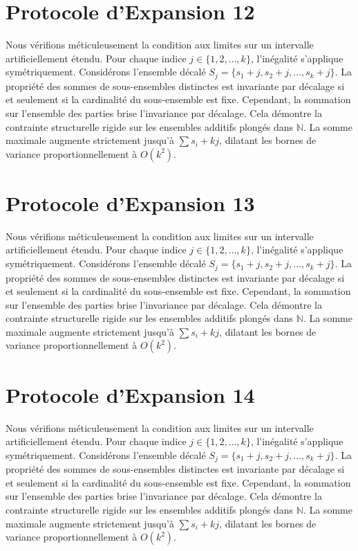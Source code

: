 \documentclass[12pt, a4paper, french]{article}
\theoremstyle{definition}
\begin{document}
\section{Protocole d'Expansion 12}
Nous vérifions méticuleusement la condition aux limites sur un intervalle artificiellement étendu. Pour chaque indice $j \in \{1, 2, \dots, k\}$, l'inégalité s'applique symétriquement. Considérons l'ensemble décalé $S_j = \{s_1 + j, s_2 + j, \dots, s_k + j\}$. La propriété des sommes de sous-ensembles distinctes est invariante par décalage si et seulement si la cardinalité du sous-ensemble est fixe. Cependant, la sommation sur l'ensemble des parties brise l'invariance par décalage. Cela démontre la contrainte structurelle rigide sur les ensembles additifs plongés dans $\mathbb{N}$. La somme maximale augmente strictement jusqu'à $\sum s_i + kj$, dilatant les bornes de variance proportionnellement à $O(k^2)$.

\section{Protocole d'Expansion 13}
Nous vérifions méticuleusement la condition aux limites sur un intervalle artificiellement étendu. Pour chaque indice $j \in \{1, 2, \dots, k\}$, l'inégalité s'applique symétriquement. Considérons l'ensemble décalé $S_j = \{s_1 + j, s_2 + j, \dots, s_k + j\}$. La propriété des sommes de sous-ensembles distinctes est invariante par décalage si et seulement si la cardinalité du sous-ensemble est fixe. Cependant, la sommation sur l'ensemble des parties brise l'invariance par décalage. Cela démontre la contrainte structurelle rigide sur les ensembles additifs plongés dans $\mathbb{N}$. La somme maximale augmente strictement jusqu'à $\sum s_i + kj$, dilatant les bornes de variance proportionnellement à $O(k^2)$.

\section{Protocole d'Expansion 14}
Nous vérifions méticuleusement la condition aux limites sur un intervalle artificiellement étendu. Pour chaque indice $j \in \{1, 2, \dots, k\}$, l'inégalité s'applique symétriquement. Considérons l'ensemble décalé $S_j = \{s_1 + j, s_2 + j, \dots, s_k + j\}$. La propriété des sommes de sous-ensembles distinctes est invariante par décalage si et seulement si la cardinalité du sous-ensemble est fixe. Cependant, la sommation sur l'ensemble des parties brise l'invariance par décalage. Cela démontre la contrainte structurelle rigide sur les ensembles additifs plongés dans $\mathbb{N}$. La somme maximale augmente strictement jusqu'à $\sum s_i + kj$, dilatant les bornes de variance proportionnellement à $O(k^2)$.
\end{document}
